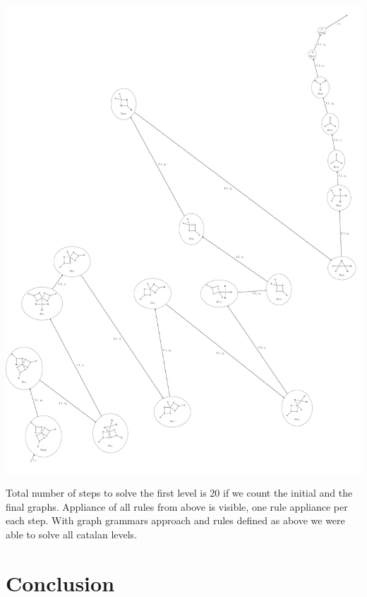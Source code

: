 \documentclass[a4paper,10pt,titlepage]{report}
\begin{document}
\vspace{10mm}
\includegraphics[scale=0.3]{063.pdf}
\vspace{10mm}

Total number of steps to solve the first level is 20 if we count the initial and the final graphs. Appliance of all rules from above is visible, one rule appliance per each step. With graph grammars approach and rules defined as above we were able to solve all catalan levels. 

\newpage
\section{Conclusion}
\end{document}
